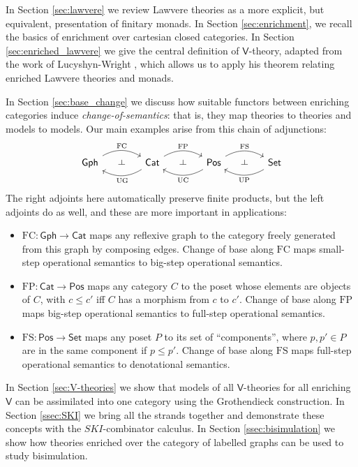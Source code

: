 \documentclass{amsart}
\theoremstyle{definition}
\def\ld{\rotatebox[origin=c]{-90}{$\dashv$}} %
\newcommand{\Gph}{\mathsf{Gph}}
\newcommand{\Set}{\mathsf{Set}}
\newcommand{\Cat}{\mathsf{Cat}}
\newcommand{\Pos}{\mathsf{Pos}}
\newcommand{\V}{\mathsf{V}}
\newcommand{\FC}{\mathrm{FC}}
\newcommand{\FP}{\mathrm{FP}}
\newcommand{\FS}{\mathrm{FS}}
\newcommand{\UC}{\mathrm{UC}}
\newcommand{\UP}{\mathrm{UP}}
\newcommand{\UG}{\mathrm{UG}}
\newcommand{\maps}{\colon}
\begin{document}
In Section \ref{sec:lawvere} we review Lawvere theories as a more explicit, but equivalent, presentation of finitary monads. In Section \ref{sec:enrichment}, we recall the basics of enrichment over cartesian closed categories.   In Section \ref{sec:enriched_lawvere} we give the central definition of $\V$-theory, adapted from the work of Lucyshyn-Wright \cite{lucyshyn-wright}, which allows us to apply his theorem relating enriched Lawvere theories and monads.

In Section \ref{sec:base_change} we discuss how suitable functors between enriching categories induce \textit{change-of-semantics}: that is, they map theories to theories and models to models.   Our main examples arise from this chain of adjunctions:
\[\begin{tikzcd}[column sep=small]
\Gph \arrow[bend left,below]{rr}{\FC}
& \ld &
\arrow[bend left,above]{ll}{\UG} \Cat \arrow[bend left,below]{rr}{\FP}
& \ld &
\arrow[bend left,above]{ll}{\UC} \Pos \arrow[bend left,below]{rr}{\FS}
& \ld &
\Set \arrow[bend left,above]{ll}{\UP}
\end{tikzcd}\]
The right adjoints here automatically preserve finite products, but the left adjoints 
do as well, and these are more important in applications:
\begin{itemize}
\item 
$\FC \maps \Gph \to \Cat$ maps any reflexive graph to the category freely generated from 
this graph by composing edges.  Change of base along $\FC$ maps small-step operational semantics to big-step operational semantics.
\item
$\FP \maps \Cat \to \Pos$ maps any category $C$ to the poset whose elements are objects of $C$, with $c \le c'$ iff $C$ has a morphism from $c$ to $c'$.
Change of base along $\FP$ maps big-step operational semantics to full-step operational semantics.
\item
$\FS \maps \Pos \to \Set$ maps any poset $P$ to its set of ``components'', where $p,p' \in P$ are in the same component if $p \le p'$.
Change of base along $\FS$ maps full-step operational semantics to
denotational semantics.
\end{itemize}

In Section \ref{sec:V-theories} we show that models of all $\V$-theories for all enriching $\V$ can be assimilated into one category using the Grothendieck construction.  In Section \ref{ssec:SKI} we bring all the strands together and demonstrate these concepts with the $SKI$-combinator calculus.  In Section \ref{ssec:bisimulation} we show how theories enriched over the category of labelled graphs can be used to study bisimulation.
\end{document}
